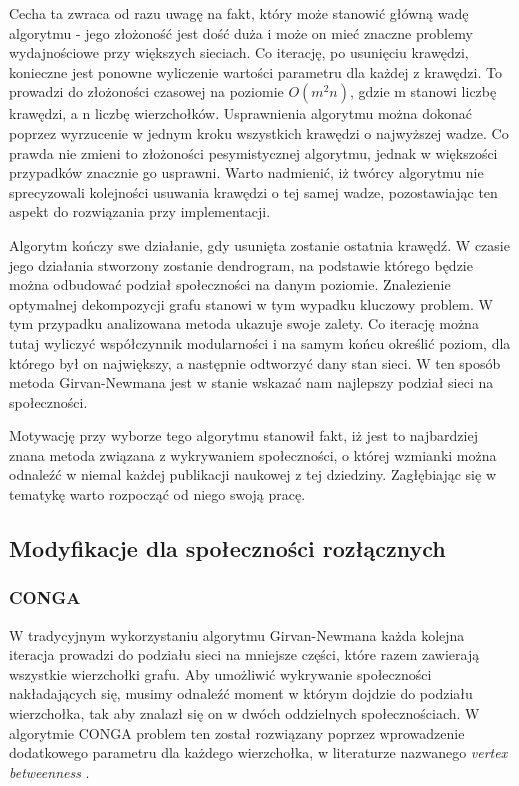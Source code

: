 \documentclass{article}
\begin{document}
Cecha ta zwraca od razu uwagę na fakt, który może stanowić główną wadę algorytmu - jego złożoność jest dość duża i może on mieć znaczne problemy wydajnościowe przy większych sieciach. Co iterację, po usunięciu krawędzi, konieczne jest ponowne wyliczenie wartości parametru dla każdej z krawędzi. To prowadzi do złożoności czasowej na poziomie $O({m}^2n)$, gdzie m stanowi liczbę krawędzi, a n liczbę wierzchołków. Usprawnienia algorytmu można dokonać poprzez wyrzucenie w jednym kroku wszystkich krawędzi o najwyższej wadze. Co prawda nie zmieni to złożoności pesymistycznej algorytmu, jednak w większości przypadków znacznie go usprawni. Warto nadmienić, iż twórcy algorytmu nie sprecyzowali kolejności usuwania krawędzi o tej samej wadze, pozostawiając ten aspekt do rozwiązania przy implementacji.

Algorytm kończy swe działanie, gdy usunięta zostanie ostatnia krawędź. W czasie jego działania stworzony zostanie dendrogram, na podstawie którego będzie można odbudować podział społeczności na danym poziomie. Znalezienie optymalnej dekompozycji grafu stanowi w tym wypadku kluczowy problem. W tym przypadku analizowana metoda ukazuje swoje zalety. Co iterację można tutaj wyliczyć współczynnik modularności i na samym końcu określić poziom, dla którego był on największy, a następnie odtworzyć dany stan sieci. W ten sposób metoda Girvan-Newmana jest w stanie wskazać nam najlepszy podział sieci na społeczności.

Motywację przy wyborze tego algorytmu stanowił fakt, iż jest to najbardziej znana metoda związana z wykrywaniem społeczności, o której wzmianki można odnaleźć w niemal każdej publikacji naukowej z tej dziedziny. Zagłębiając się w tematykę warto rozpocząć od niego swoją pracę. 
\subsection{Modyfikacje dla społeczności rozłącznych}
\subsubsection{CONGA}
W tradycyjnym wykorzystaniu algorytmu Girvan-Newmana każda kolejna iteracja prowadzi do podziału sieci na mniejsze części, które razem zawierają wszystkie wierzchołki grafu. Aby umożliwić wykrywanie społeczności nakładających się, musimy odnaleźć moment w którym dojdzie do podziału wierzchołka, tak aby znalazł się on w dwóch oddzielnych społecznościach. W algorytmie CONGA problem ten został rozwiązany poprzez wprowadzenie dodatkowego parametru dla każdego wierzchołka, w literaturze nazwanego \textit{vertex betweenness} \cite{is-paper2}.
\end{document}
